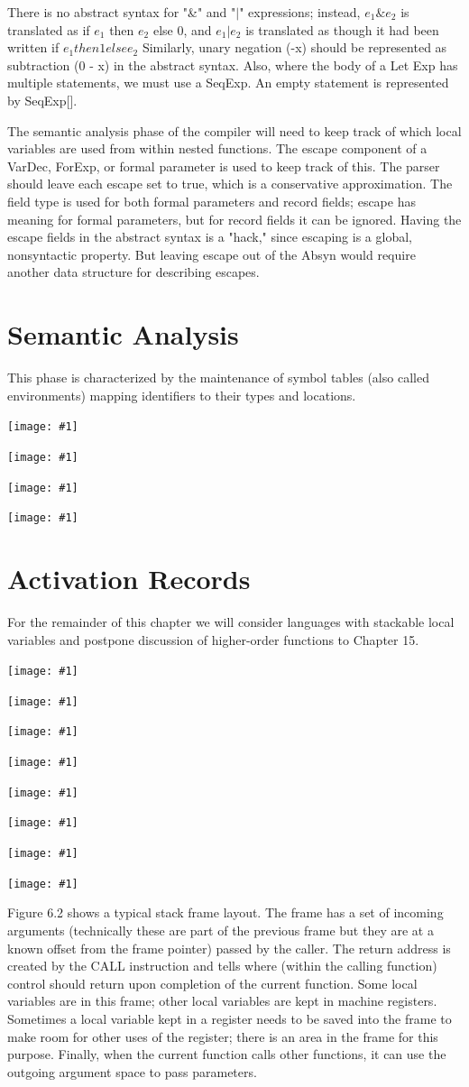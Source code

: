 \documentclass[8pt, a4paper, oneside, twocolumn]{extarticle}
\newcommand{\ph}[1]{
    \texttt{[image: \#1]}
}
\begin{document}
There is no abstract syntax for "\&" and "$\vert$" expressions; instead, $e_1\&e_2$ is
translated as if $e_1$ then $e_2$ else 0, and $e_1 \vert e_2$ is translated as though it had
been written if $e_1 then 1 else e_2$
Similarly, unary negation (-x) should be represented as subtraction (0 -
x) in the abstract syntax. Also, where the body of a Let Exp has multiple
statements, we must use a SeqExp. An empty statement is represented by
SeqExp[].

The semantic analysis phase of the compiler will need to keep track of
which local variables are used from within nested functions. The escape
component of a VarDec, ForExp, or formal parameter is used to keep track
of this. The parser should leave each escape set to true, which is a 
conservative approximation. The field type is used for both formal parameters
and record fields; escape has meaning for formal parameters, but for record
fields it can be ignored.
Having the escape fields in the abstract syntax is a "hack," since 
escaping is a global, nonsyntactic property. But leaving escape out of the Absyn
would require another data structure for describing escapes.
\section{Semantic Analysis}
This phase is characterized by the maintenance of symbol tables (also called
environments) mapping identifiers to their types and locations.

\ph{sem1}

\ph{sem2}

\ph{sem3}

\ph{sem4}


\section{Activation Records}
For the remainder of this chapter we will consider languages with stackable
local variables and postpone discussion of higher-order functions to 
Chapter 15.

\ph{r1}

\ph{r2}

\ph{r3}

\ph{r4}

\ph{r5}

\ph{r6}

\ph{r7}

\ph{r8}

Figure 6.2 shows a typical stack frame layout. The frame has a set of 
incoming arguments (technically these are part of the previous frame but they
are at a known offset from the frame pointer) passed by the caller. The 
return address is created by the CALL instruction and tells where (within the
calling function) control should return upon completion of the current 
function. Some local variables are in this frame; other local variables are kept in
machine registers. Sometimes a local variable kept in a register needs to be
saved into the frame to make room for other uses of the register; there is an
area in the frame for this purpose. Finally, when the current function calls
other functions, it can use the outgoing argument space to pass parameters.
\end{document}
